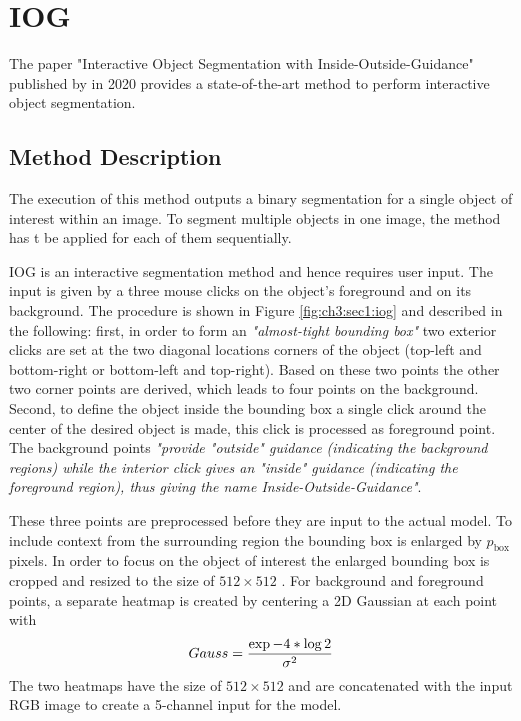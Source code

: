 
\section{IOG}\label{ord:ch3:sec1}

The paper "Interactive Object Segmentation with Inside-Outside-Guidance"\cite{Zha20IOG} published by \citeauthor{Zha20IOG} \etal in 2020 provides a state-of-the-art method to perform interactive object segmentation.

\subsection{Method Description}\label{ord:ch3:sec1:subsec1}
The execution of this method outputs a binary segmentation for a single object of interest within an image. 
To segment multiple objects in one image, the method has t be applied for each of them sequentially.

IOG is an interactive segmentation method and hence requires user input. 
The input is given by a three mouse clicks on the object's foreground and on its background.
The procedure is shown in Figure \ref{fig:ch3:sec1:iog} and described in the following:
first, in order to form an \emph{"almost-tight bounding box"}\cite[p. 12235]{Zha20IOG} two exterior clicks are set at the two diagonal locations corners of the object (top-left and bottom-right or bottom-left and top-right).
Based on these two points the other two corner points are derived, which leads to four points on the background. 
Second, to define the object inside the bounding box a single click around the center of the desired object is made, this click is processed as foreground point. 
The background points \emph{"provide "outside" guidance (indicating the background regions) while the interior click gives an "inside" guidance (indicating the foreground region), thus giving the name \textit{Inside-Outside-Guidance}"}\cite[p. 12235]{Zha20IOG}.

These three points are preprocessed before they are input to the actual model. To include context from the surrounding region the bounding box is enlarged by $p_{\text{box}}$ pixels. 
In order to focus on the object of interest the enlarged bounding box is cropped and resized to the size of $512 \times 512$ . 
For background and foreground points, a separate heatmap is created by centering a 2D Gaussian at each point with
\begin{equation} \label{equ:gauss}
	\centering
	Gauss = \frac{\exp{-4 * \log 2 }}{\sigma^{2}}
\end{equation}
The two heatmaps have the size of $512 \times 512$  and are concatenated with the input RGB image to create a 5-channel input for the model. 

